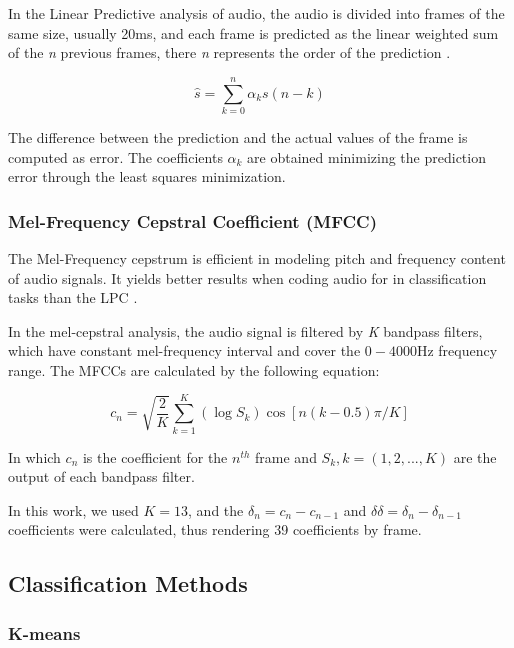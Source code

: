 \documentclass[12pt]{article}
\begin{document}
In the Linear Predictive analysis of audio, the audio is divided into frames of the same size, usually 20ms, and each frame is predicted as the linear weighted sum of the \textit{n} previous frames, there \textit{n} represents the order of the prediction \cite{Rabiner:1993:FSR:153687}. 

\begin{equation}
	\hat{s} = \sum_{k=0}^{n} \alpha_ks(n-k)
	\label{eq:lpc}
\end{equation}


The difference between the prediction and the actual values of the frame is computed as error. The coefficients $\alpha_k$ are obtained minimizing the prediction error through the least squares minimization.


\subsubsection{Mel-Frequency Cepstral Coefficient (MFCC)} \label{class:mfcc}

The Mel-Frequency cepstrum is efficient in modeling pitch and frequency content of audio signals. It yields better results when coding audio for in classification tasks than the LPC \cite{li2001classification}.

In the mel-cepstral analysis, the audio signal is filtered by \textit{K} bandpass filters, which have constant mel-frequency interval and cover the $0-4000$Hz frequency range. The MFCCs are calculated by the following equation:

\begin{equation}
	c_n = \sqrt{\frac{2}{K}} \sum_{k=1}^{K} (\log S_k) \cos [n(k-0.5)\pi/K]
	\label{eq:mfcc}
\end{equation}

In which $c_n$ is the coefficient for the $n^{th}$ frame and $S_k, k=(1,2,...,K)$ are the output of each bandpass filter.

In this work, we used $K = 13$, and the $\delta_n = c_n - c_{n-1}$ and $\delta\delta = \delta_n - \delta_{n-1} $ coefficients were calculated, thus rendering 39 coefficients by frame.

\subsection{Classification Methods} \label{class:meth}

\subsubsection{K-means} \label{class:kmeans}
\end{document}
